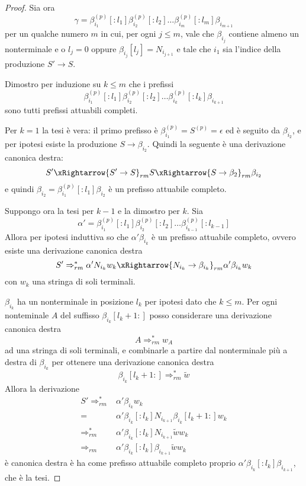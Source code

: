 \documentclass[12pt]{article}
\numberwithin{theorem}{subsection}
\begin{document}
\begin{proof}
	\vspace{0.8cm}
	Sia ora
	\[
	\gamma = \beta_{i_1}^{(p)}[:l_1] \beta_{i_2}^{(p)}[:l_2] \dots \beta_{i_m}^{(p)}[:l_m] \beta_{i_{m+1}}
	\]
	per un qualche numero $m$ in cui, per ogni $j \le m$, vale che $\beta_{i_j}$ contiene almeno un nonterminale e o $l_j = 0$ oppure $\beta_{i_j}[l_j] = N_{i_{j + 1}}$ e tale che $i_1$ sia l'indice della produzione $S' \rightarrow S$.
	
	Dimostro per induzione su $k \le m$ che i prefissi
	\[
	\beta_{i_1}^{(p)}[:l_1] \beta_{i_2}^{(p)}[:l_2] \dots \beta_{i_k}^{(p)}[:l_k] \beta_{i_{k+1}}
	\]
	sono tutti prefissi attuabili completi.
	
	Per $k = 1$ la tesi è vera: il primo prefisso è $\beta_{i_1}^{(p)} = S^{(p)} = \epsilon$ ed è seguito da $\beta_{i_2}$, e per ipotesi esiste la produzione $S \rightarrow \beta_{i_2}$. Quindi la seguente è una derivazione canonica destra:
	\[
	S' \xRightarrow{S' \rightarrow S}_{rm} S \xRightarrow{S \rightarrow \beta_2}_{rm} \beta_{i_2}
	\]
	e quindi $\beta_{i_2} = \beta_{i_1}^{(p)}[:l_1] \beta_{i_2}$ è un prefisso attuabile completo.
	
	Suppongo ora la tesi per $k - 1$ e la dimostro per $k$. Sia
	\[
	\alpha' = \beta_{i_1}^{(p)}[:l_1] \beta_{i_2}^{(p)}[:l_2] \dots \beta_{i_{k-1}}^{(p)}[:l_{k-1}]
	\]
	Allora per ipotesi induttiva so che $\alpha' \beta_{i_k}$ è un prefisso attuabile completo, ovvero esiste una derivazione canonica destra
	\[
	S' \Rightarrow^*_{rm} \alpha' N_{i_k} w_k \xRightarrow{N_{i_k} \rightarrow \beta_{i_k}}_{rm} \alpha' \beta_{i_k} w_k
	\]
	con $w_k$ una stringa di soli terminali.
	
	$\beta_{i_k}$ ha un nonterminale in posizione $l_k$ per ipotesi dato che $k \le m$.
	Per ogni nonteminale $A$ del suffisso $\beta_{i_k}[l_k + 1:]$ posso considerare una derivazione canonica destra
	\[
	A \Rightarrow^*_{rm} w_A
	\]
	ad una stringa di soli terminali, e combinarle a partire dal nonterminale più a destra di $\beta_{i_k}$ per ottenere una derivazione canonica destra
	\[
	\beta_{i_k}[l_k + 1:] \Rightarrow^*_{rm} \tilde{w}
	\]
	Allora la derivazione
	\begin{align*}
		S' \Rightarrow^*_{rm} &\alpha' \beta_{i_k} w_k \\
		= \: &\alpha' \beta_{i_k}[:l_k] N_{i_{k+1}} \beta_{i_k}[l_k + 1:] w_k \\
		\Rightarrow^*_{rm} &\alpha' \beta_{i_k}[:l_k] N_{i_{k+1}} \tilde{w} w_k \\
		\Rightarrow_{rm} &\alpha' \beta_{i_k}[:l_k] \beta_{i_{k+1}} \tilde{w} w_k
	\end{align*}
	è canonica destra è ha come prefisso attuabile completo proprio $\alpha' \beta_{i_k}[:l_k] \beta_{i_{k+1}}$, che è la tesi.
\end{proof}
\end{document}
